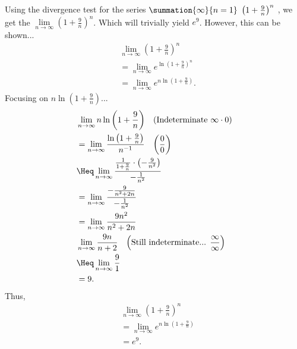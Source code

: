 \documentclass{report}
\begin{document}
   \bigbreak \noindent 
   Using the divergence test for the series $\summation{\infty}{n=1}\ \left(1+\frac{9}{n}\right)^{n}\ $, we get the $\lim\limits_{n \to \infty}{\left(1+\frac{9}{n}\right)^{n}} $. Which will trivially  yield $e^{9}$. However, this can be shown...
   \begin{align*}
       &\lim\limits_{n \to \infty}{\left(1+\frac{9}{n}\right)^{n}} \\
       &=\lim\limits_{n \to \infty}{e^{\ln{\left(1+\frac{9}{n}\right)^{n}}}} \\
       &=\lim\limits_{n \to \infty}{e^{n\ln{\left(1+\frac{9}{n}\right)}}} 
   .\end{align*}
   \bigbreak \noindent 
   Focusing on $n\ln{\left(1+\frac{9}{n}\right)} $...
   \begin{align*}
       &\lim\limits_{n \to \infty}{n\ln{\left(1+\frac{9}{n}\right)}} \quad \text{(Indeterminate $\infty\cdot 0$)} \\
       &=\lim\limits_{n \to \infty}{\frac{\ln{\left(1+\frac{9}{n}\right)}}{n^{-1}}} \quad \text{$\left(\frac{0}{0}\right)$} \\
       & \Heq\lim\limits_{n \to \infty}{\frac{\frac{1}{1+\frac{9}{n}}\cdot \left(-\frac{9}{n^{2}}\right)}{-\frac{1}{n^{2}}}} \\
       &=\lim\limits_{n \to \infty}{\frac{-\frac{9}{n^{2}+2n}}{-\frac{1}{n^{2}}}} \\
       &=\lim\limits_{n \to \infty}{\frac{9n^{2}}{n^{2}+2n}} \\
       &\lim\limits_{n \to \infty}{\frac{9n}{n+2}} \quad \text{$\left(\text{Still indeterminate... } \frac{\infty}{\infty}\right)$} \\
       &\Heq\lim\limits_{n \to \infty}{\frac{9}{1}} \\ 
       &=9
   .\end{align*}
   \bigbreak \noindent 
   Thus,
   \begin{align*}
       &\lim\limits_{n \to \infty}{\left(1+\frac{9}{n}\right)^{n}} \\
       &=\lim\limits_{n \to \infty}{e^{n\ln{\left(1+\frac{9}{n}\right)}}} \\
       &=e^{9}
   .\end{align*}

    
\end{document}
